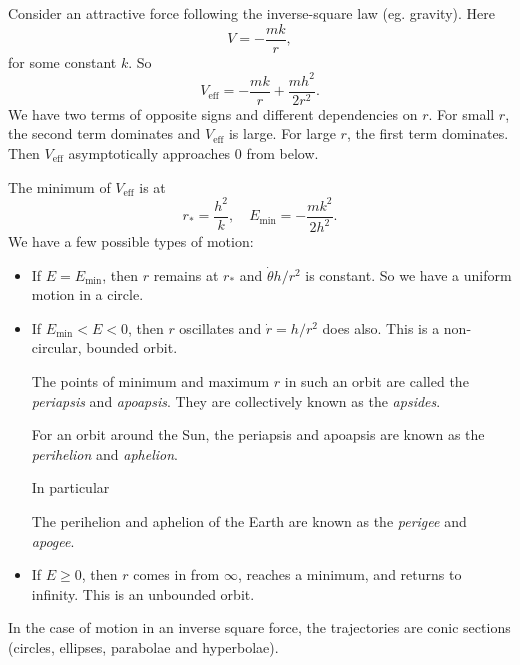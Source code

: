 \documentclass[a4paper]{article}
\begin{document}
\begin{eg}
  Consider an attractive force following the inverse-square law (eg. gravity). Here
  \[
    V = -\frac{mk}{r},
  \]
  for some constant $k$. So
  \[
    V_{\text{eff}} = -\frac{mk}{r} + \frac{mh^2}{2r^2}.
  \]
  We have two terms of opposite signs and different dependencies on $r$. For small $r$, the second term dominates and $V_{\text{eff}}$ is large. For large $r$, the first term dominates. Then $V_{\text{eff}}$ asymptotically approaches $0$ from below.

  \begin{center}
  \end{center}

  The minimum of $V_{\text{eff}}$ is at
  \[
    r_{*} = \frac{h^2}{k},\quad E_{\text{min}} = -\frac{mk^2}{2h^2}.
  \]
  We have a few possible types of motion:
  \begin{itemize}
    \item If $E = E_{\min}$, then $r$ remains at $r_*$ and $\dot{\theta} h/r^2$ is constant. So we have a uniform motion in a circle.
    \item If $E_{\min} < E < 0$, then $r$ oscillates and $\dot{r}=h/r^2$ does also. This is a non-circular, bounded orbit.

      \begin{defi}
        The points of minimum and maximum $r$ in such an orbit are called the \emph{periapsis} and \emph{apoapsis}. They are collectively known as the \emph{apsides}.
      \end{defi}

      \begin{defi}
        For an orbit around the Sun, the periapsis and apoapsis are known as the \emph{perihelion} and \emph{aphelion}.
      \end{defi}

      In particular
      \begin{defi}
        The perihelion and aphelion of the Earth are known as the \emph{perigee} and \emph{apogee}.
      \end{defi}

    \item If $E \geq 0$, then $r$ comes in from $\infty$, reaches a minimum, and returns to infinity. This is an unbounded orbit.
  \end{itemize}

  In the case of motion in an inverse square force, the trajectories are conic sections (circles, ellipses, parabolae and hyperbolae).
\end{eg}
\end{document}
